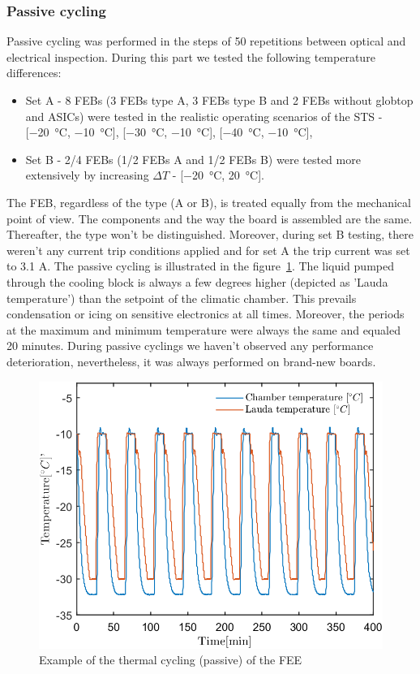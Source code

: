 \subsubsection{Passive cycling}
Passive cycling was performed in the steps of 50 repetitions between optical and electrical inspection. During this part we tested the following temperature differences:
\begin{itemize}
    \item Set A - 8 \glspl{FEB} (3 \glspl{FEB} type A, 3 \glspl{FEB} type B and 2 \glspl{FEB} without globtop and \glspl{ASIC}) were tested in the realistic operating scenarios of the \gls{STS} - [\SI{-20}{\celsius}, \SI{-10}{\celsius}], [\SI{-30}{\celsius}, \SI{-10}{\celsius}], [\SI{-40}{\celsius}, \SI{-10}{\celsius}],
    \item Set B - 2/4 \glspl{FEB} (1/2 \glspl{FEB} A and 1/2 \glspl{FEB} B) were tested more extensively by increasing $\Delta T$ - [\SI{-20}{\celsius}, \SI{20}{\celsius}].
\end{itemize}
The \gls{FEB}, regardless of the type (A or B), is treated equally from the mechanical point of view. The components and the way the board is assembled are the same. Thereafter, the type won't be distinguished. Moreover, during set B testing, there weren't any current trip conditions applied and for set A the trip current was set to 3.1 A. The passive cycling is illustrated in the figure~\ref{fig_passive_cycling}. The liquid pumped through the cooling block is always a few degrees higher (depicted as 'Lauda temperature') than the setpoint of the climatic chamber. This prevails condensation or icing on sensitive electronics at all times. Moreover, the periods at the maximum and minimum temperature were always the same and equaled 20 minutes. During passive cyclings we haven't observed any performance deterioration, nevertheless, it was always performed on brand-new boards.
\begin{figure}[!h]
\centering
\includegraphics[width=0.55\columnwidth]{Chapter3/Cycling/Images/active_cycling.png}
\caption{Example of the thermal cycling (passive) of the FEE}
\label{fig_passive_cycling}
\end{figure}

